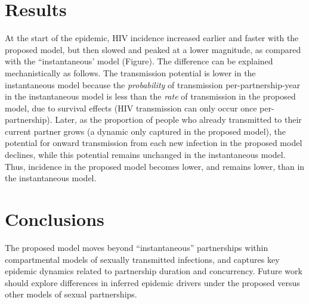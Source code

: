 \section{Results}  %
At the start of the epidemic, HIV incidence increased earlier and faster with the proposed model, but
then slowed and peaked at a lower magnitude, as compared with the ``instantaneous'  model (Figure). 
The difference can be explained mechanistically as follows.
The transmission potential is lower in the instantaneous model
because the \emph{probability} of transmission per-partnership-year in the instantaneous model
is less than the \emph{rate} of transmission in the proposed model,
due to survival effects (HIV transmission can only occur once per-partnership). %
Later, as the proportion of people who already transmitted to their current partner grows
(a dynamic only captured in the proposed model),
the potential for onward transmission from each new infection in the proposed model declines,
while this potential remains unchanged in the instantaneous model.  
Thus, incidence in the proposed model becomes lower, and remains lower,
than in the instantaneous model.
\section{Conclusions}
The proposed model moves beyond ``instantaneous'' partnerships
within compartmental models of sexually transmitted infections,
and captures key epidemic dynamics related to partnership duration and concurrency.
Future work should explore differences in inferred epidemic drivers under
the proposed versus other models of sexual partnerships.
